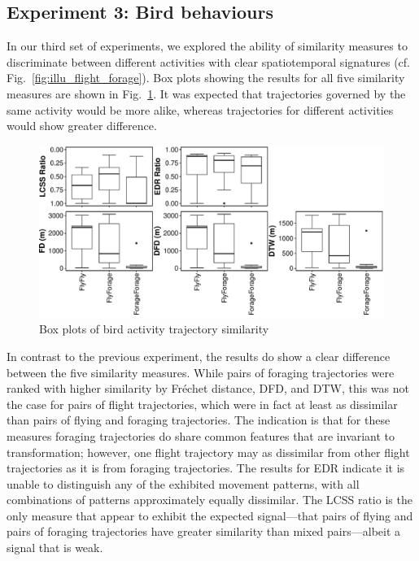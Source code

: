 \documentclass{interact}
\begin{document}
\subsection{Experiment 3: Bird behaviours}
\label{par:result_3}
In our third set of experiments, we explored the ability of similarity measures to discriminate between different activities with clear spatiotemporal signatures (cf. Fig.~\ref{fig:illu_flight_forage}). Box plots showing the results for all five similarity measures are  shown in Fig.~\ref{fig:bird_activity}. It was expected that trajectories governed by the same activity would be more alike, whereas trajectories for different activities would show greater difference.

\begin{figure}[ht]
	\includegraphics[width=\linewidth]{figures/Exp3}
	\caption{Box plots of bird activity trajectory similarity} \label{fig:bird_activity}
\end{figure}

In contrast to the previous experiment, the results do show a clear difference between the five similarity measures. While pairs of foraging trajectories were ranked with higher similarity by Fréchet distance, DFD, and DTW, this was not the case for pairs of flight trajectories, which were in fact at least as dissimilar than pairs of flying and foraging trajectories. The indication is that for these measures foraging trajectories do share common features that are invariant to transformation; however, one flight trajectory may as dissimilar from other flight trajectories as it is from foraging trajectories. The results for EDR indicate it is unable to distinguish any of the exhibited movement patterns, with all combinations of patterns approximately equally dissimilar. The LCSS ratio is the only measure that appear to exhibit the expected signal---that pairs of flying and pairs of foraging trajectories have greater similarity than mixed pairs---albeit a signal that is weak.
\end{document}
